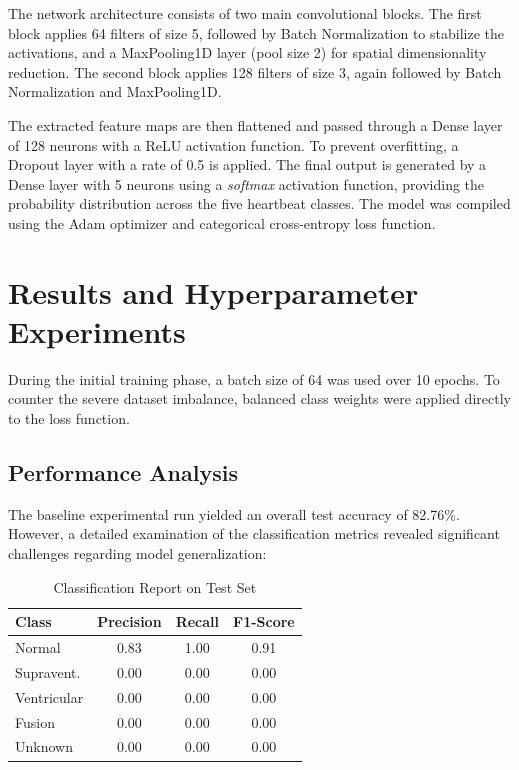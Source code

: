 \documentclass[10pt,a4paper,twocolumn]{article}
\begin{document}
The network architecture consists of two main convolutional blocks. The first block applies 64 filters of size 5, followed by Batch Normalization to stabilize the activations, and a MaxPooling1D layer (pool size 2) for spatial dimensionality reduction. The second block applies 128 filters of size 3, again followed by Batch Normalization and MaxPooling1D.

The extracted feature maps are then flattened and passed through a Dense layer of 128 neurons with a ReLU activation function. To prevent overfitting, a Dropout layer with a rate of 0.5 is applied. The final output is generated by a Dense layer with 5 neurons using a \textit{softmax} activation function, providing the probability distribution across the five heartbeat classes. The model was compiled using the Adam optimizer and categorical cross-entropy loss function.

\section{Results and Hyperparameter Experiments}
During the initial training phase, a batch size of 64 was used over 10 epochs. To counter the severe dataset imbalance, balanced class weights were applied directly to the loss function. 

\subsection{Performance Analysis}
The baseline experimental run yielded an overall test accuracy of 82.76\%. However, a detailed examination of the classification metrics revealed significant challenges regarding model generalization:

\begin{table}[h]
\centering
\begin{tabular}{lccc}
\toprule
\textbf{Class} & \textbf{Precision} & \textbf{Recall} & \textbf{F1-Score} \\
\midrule
Normal & 0.83 & 1.00 & 0.91 \\
Supravent. & 0.00 & 0.00 & 0.00 \\
Ventricular & 0.00 & 0.00 & 0.00 \\
Fusion & 0.00 & 0.00 & 0.00 \\
Unknown & 0.00 & 0.00 & 0.00 \\
\bottomrule
\end{tabular}
\caption{Classification Report on Test Set}
\label{tab:results}
\end{table}
\end{document}

